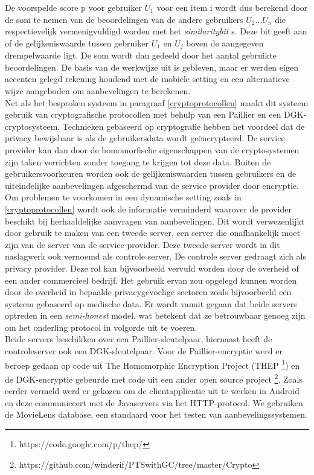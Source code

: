 De voorspelde score p voor gebruiker $U_1$ voor een item i wordt dus berekend door de som te nemen van de beoordelingen van de andere gebruikers $U_2 ... U_n$ die respectievelijk vermenigvuldigd worden met het \emph{similaritybit} s. Deze bit geeft aan of de gelijkeniswaarde tussen gebruiker $U_1$ en $U_j$ boven de aangegeven drempelwaarde ligt. De som wordt dan gedeeld door het aantal gebruikte beoordelingen. De basis van de werkwijze uit \cite{ZErkinDyn} is gebleven, maar er werden eigen accenten gelegd rekening houdend met de mobiele setting en een alternatieve wijze aangeboden om aanbevelingen te berekenen. \\Net als het besproken systeem in paragraaf \ref{cryptoprotocollen} maakt dit systeem gebruik van cryptografische protocollen met behulp van een Paillier en een DGK-cryptosysteem. Technieken gebaseerd op cryptografie hebben het voordeel dat de privacy bewijsbaar is als de gebruikersdata wordt ge\"encrypteerd. De service provider kan dan door de homomorfische eigenschappen van de cryptosystemen zijn taken verrichten zonder toegang te krijgen tot deze data. Buiten de gebruikersvoorkeuren worden ook de gelijkeniswaarden tussen gebruikers en de uiteindelijke aanbevelingen afgeschermd van de service provider door encryptie.\\ Om problemen te voorkomen in een dynamische setting zoals in \ref{cryptoprotocollen} wordt ook de informatie verminderd waarover de provider beschikt bij herhaaldelijke aanvragen van aanbevelingen. Dit wordt verwezenlijkt door gebruik te maken van een tweede server, een server die onafhankelijk moet zijn van de server van de service provider. Deze tweede server wordt in dit naslagwerk ook vernoemd als controle server. De controle server gedraagt zich als privacy provider. Deze rol kan bijvoorbeeld vervuld worden door de overheid of een ander commercieel bedrijf. Het gebruik ervan zou opgelegd kunnen worden door de overheid in bepaalde privacygevoelige sectoren zoals bijvoorbeeld een systeem gebaseerd op medische data. Er wordt vanuit gegaan dat beide servers optreden in een \emph{semi-honest} model, wat betekent dat ze betrouwbaar genoeg zijn om het onderling protocol in volgorde uit te voeren. \\ Beide servers beschikken over een Paillier-sleutelpaar, hiernaast heeft de controleserver ook een DGK-sleutelpaar. Voor de Paillier-encryptie werd er beroep gedaan op code uit The Homomorphic Encryption Project (THEP \footnote{https://code.google.com/p/thep/}) en de DGK-encryptie gebeurde met code uit een ander open source project \footnote{https://github.com/winderif/PTSwithGC/tree/master/Crypto}. Zoals eerder vermeld werd er gekozen om de clientapplicatie uit te werken in Android en deze communiceert met de Javaservers via het HTTP-protocol. We gebruiken de MovieLens database, een standaard voor het testen van aanbevelingssystemen.